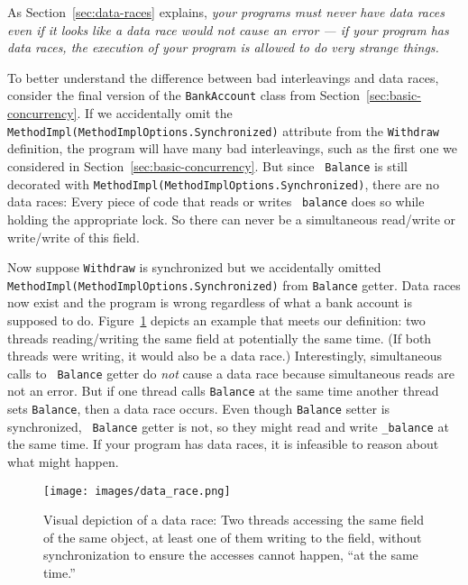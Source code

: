 \documentclass[10pt]{article}
\begin{document}
As Section~\ref{sec:data-races} explains, \emph{your programs must
  never have data races even if it looks like a data race would not
  cause an error --- if your program has data races, the execution of
  your program is allowed to do very strange things.}

To better understand the difference between bad interleavings and data races,
consider the final version of the {\tt BankAccount} class from
Section~\ref{sec:basic-concurrency}.  If we accidentally omit the {\tt
  MethodImpl(MethodImplOptions.Synchronized)} attribute from the {\tt Withdraw} definition, the
program will have many bad interleavings, such as the first one we
considered in Section~\ref{sec:basic-concurrency}.  But since {\tt
  Balance} is still decorated with {\tt MethodImpl(MethodImplOptions.Synchronized)}, there
are no data races: Every piece of code that reads or writes {\tt
  balance} does so while holding the appropriate lock.  So there can
never be a simultaneous read/write or write/write of this field.

Now suppose {\tt Withdraw} is synchronized but we accidentally
omitted {\tt MethodImpl(MethodImplOptions.Synchronized)} from {\tt Balance} getter. 
Data races now exist and the program is wrong regardless of what a bank account is
supposed to do.  Figure~\ref{fig:data_race} depicts an example that
meets our definition: two threads reading/writing the same field at
potentially the same time.  (If both threads were writing, it would
also be a data race.)  Interestingly, simultaneous calls to {\tt
  Balance} getter do \emph{not} cause a data race because simultaneous
reads are not an error.  But if one thread calls {\tt Balance} at
the same time another thread sets {\tt Balance}, then a data race
occurs.  Even though {\tt Balance} setter is synchronized, {\tt
  Balance} getter is not, so they might read and write {\tt \_balance} at
the same time.  If your program has data races, it is infeasible to
reason about what might happen.

\begin{figure}
\begin{center}
\texttt{[image: images/data\_race.png]}
\end{center}
\caption{Visual depiction of a data race: Two threads accessing the
  same field of the same object, at least one of them writing to the
  field, without synchronization to ensure the accesses cannot happen,
  ``at the same time.''}
\label{fig:data_race}
\end{figure}
\end{document}
